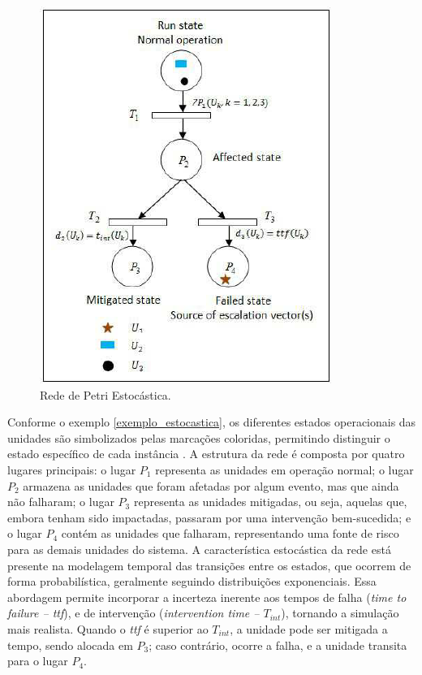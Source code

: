 \documentclass[
	12pt,				%
	openright,			%
	oneside,			%
	a4paper,			%
	english,			%
	brazil				%
	]{abntex2}
\begin{document}
\begin{figure}[ht] 
	\centering
	\includegraphics[scale=0.8]{figuras/rede_petri_estocastica.png}
	\caption[Rede de Petri Estocástica]{Rede de Petri Estocástica. \cite{inproceedings}}
	\label{fig:rede_petri_estocastica}
\end{figure}
\FloatBarrier

Conforme o exemplo \ref{exemplo_estocastica}, os diferentes estados operacionais das unidades são simbolizados pelas marcações coloridas, permitindo distinguir o estado específico de cada instância \cite{inproceedings}. A estrutura da rede é composta por quatro lugares principais: o lugar $P_{1}$ representa as unidades em operação normal; o lugar $P_{2}$ armazena as unidades que foram afetadas por algum evento, mas que ainda não falharam; o lugar $P_{3}$ representa as unidades mitigadas, ou seja, aquelas que, embora tenham sido impactadas, passaram por uma intervenção bem-sucedida; e o lugar $P_4$ contém as unidades que falharam, representando uma fonte de risco para as demais unidades do sistema. A característica estocástica da rede está presente na modelagem temporal das transições entre os estados, que ocorrem de forma probabilística, geralmente seguindo distribuições exponenciais. Essa abordagem permite incorporar a incerteza inerente aos tempos de falha (\textit{time to failure – ttf}), e de intervenção (\textit{intervention time – $T_{int}$}), tornando a simulação mais realista. Quando o \textit{ttf} é superior ao \textit{$T_{int}$}, a unidade pode ser mitigada a tempo, sendo alocada em $P_{3}$; caso contrário, ocorre a falha, e a unidade transita para o lugar $P_{4}$.
\end{document}
